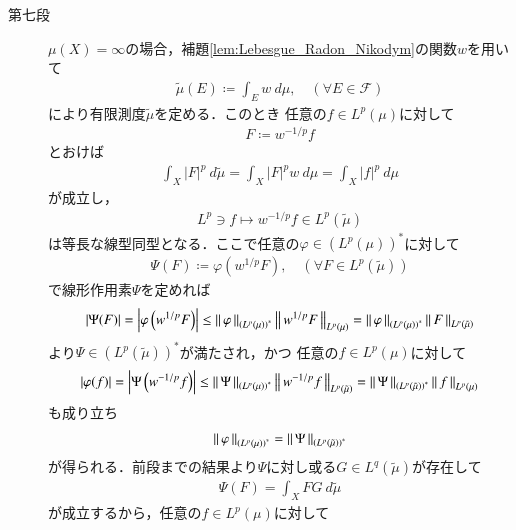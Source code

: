 \begin{prf}
\begin{description}
			\item[第七段]
				$\mu(X) = \infty$の場合，補題\ref{lem:Lebesgue_Radon_Nikodym}の関数$w$を用いて
				\begin{align}
					\tilde{\mu}(E) \coloneqq \int_E w\ d\mu,
					\quad (\forall E \in \mathscr{F})
				\end{align}
				により有限測度$\tilde{\mu}$を定める．このとき
				任意の$f \in L^p(\mu)$に対して
				\begin{align}
					F \coloneqq w^{-1/p} f
				\end{align}
				とおけば
				\begin{align}
					\int_X |F|^p\ d\tilde{\mu} = \int_X |F|^p w\ d\mu = \int_X |f|^p\ d\mu
					\label{eq:thm_dual_space_of_L_p_6}
				\end{align}
				が成立し，
				\begin{align}
					L^p \ni f \longmapsto w^{-1/p} f \in L^p(\tilde{\mu})
				\end{align}
				は等長な線型同型となる．ここで任意の$\varphi \in \left( L^p(\mu) \right)^*$に対して
				\begin{align}
					\Psi(F) \coloneqq \varphi\left( w^{1/p} F \right),
					\quad (\forall F \in L^p(\tilde{\mu}))
				\end{align}
				で線形作用素$\Psi$を定めれば
				\begin{align}
					\left| \Psi(F) \right| = \left| \varphi\left( w^{1/p} F \right) \right|
					\leq \left\|\, \varphi\, \right\|_{\left( L^p(\mu) \right)^*}\left\|\, w^{1/p} F\, \right\|_{L^p(\mu)}
					= \left\|\, \varphi\, \right\|_{\left( L^p(\mu) \right)^*}\left\|\, F\, \right\|_{L^p(\tilde{\mu})}
				\end{align}
				より$\Psi \in \left( L^p(\tilde{\mu}) \right)^*$が満たされ，かつ
				任意の$f \in L^p(\mu)$に対して
				\begin{align}
					\left| \varphi(f) \right| = \left| \Psi\left( w^{-1/p} f \right) \right|
					\leq \left\|\, \Psi\, \right\|_{\left( L^p(\mu) \right)^*}\left\|\, w^{-1/p} f\, \right\|_{L^p(\tilde{\mu})}
					= \left\|\, \Psi\, \right\|_{\left( L^p(\tilde{\mu}) \right)^*}\left\|\, f\, \right\|_{L^p(\mu)}
				\end{align}
				も成り立ち
				\begin{align}
					\left\|\, \varphi\, \right\|_{\left( L^p(\mu) \right)^*} = \left\|\, \Psi\, \right\|_{\left( L^p(\tilde{\mu}) \right)^*}
				\end{align}
				が得られる．前段までの結果より$\Psi$に対し或る$G \in L^q(\tilde{\mu})$が存在して
				\begin{align}
					\Psi(F) = \int_X FG\ d\tilde{\mu}
				\end{align}
				が成立するから，任意の$f \in L^p(\mu)$に対して

\end{description}
\end{prf}
